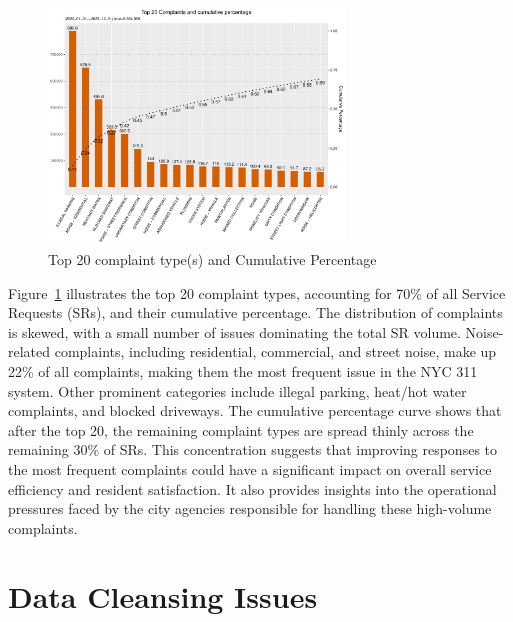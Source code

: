 \documentclass[linenumber]{jdsart}
\begin{document}
\begin{figure}[tbp]
 \centering
  \includegraphics[width=0.7\textwidth]{SR_by_Complaint_Type.pdf} 
  \caption{Top 20 complaint type(s) and Cumulative Percentage} 
  \label{fig:SR_complaints}
\end{figure}

Figure~\ref{fig:SR_complaints}
illustrates the top 20 complaint types, accounting for 70\% 
of all Service Requests (SRs), and their cumulative percentage. The 
distribution of complaints is skewed, with a small number of issues 
dominating the total SR volume. Noise-related complaints, including 
residential, commercial, and street noise, make up 22\% of all 
complaints, making them the most frequent issue in the NYC 311 system. 
Other prominent categories include illegal parking, heat/hot water 
complaints, and blocked driveways. The cumulative percentage curve 
shows that after the top 20, the remaining complaint types are spread 
thinly across the remaining 30\% of SRs. This concentration suggests 
that improving responses to the most frequent complaints could have 
a significant impact on overall service efficiency and resident 
satisfaction. It also provides insights into the operational 
pressures faced by the city agencies responsible for handling these 
high-volume complaints.


\section{Data Cleansing Issues} 
\label{sec:issues}
\end{document}
